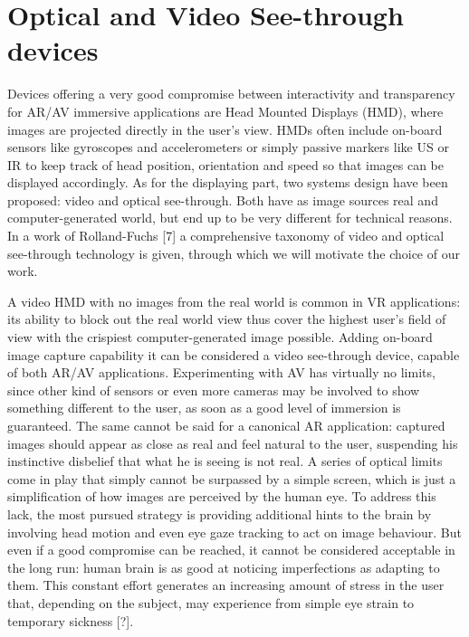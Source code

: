 \section{Optical and Video See-through devices} %
Devices offering a very good compromise between interactivity and transparency for AR/AV immersive applications are Head Mounted Displays (HMD), where images are projected directly in the user’s view. HMDs often include on-board sensors like gyroscopes and accelerometers or simply passive markers like US or IR to keep track of head position, orientation and speed so that images can be displayed accordingly. As for the displaying part, two systems design have been proposed: video and optical see-through. Both have as image sources real and computer-generated world, but end up to be very different for technical reasons. In a work of Rolland-Fuchs [7] a comprehensive taxonomy of video and optical see-through technology is given, through which we will motivate the choice of our work.

A video HMD with no images from the real world is common in VR applications: its ability to block out the real world view thus cover the highest user’s field of view with the crispiest computer-generated image possible. Adding on-board image capture capability it can be considered a video see-through device, capable of both AR/AV applications. Experimenting with AV has virtually no limits, since other kind of sensors or even more cameras may be involved to show something different to the user, as soon as a good level of immersion is guaranteed. The same cannot be said for a canonical AR application: captured images should appear as close as real and feel natural to the user, suspending his instinctive disbelief that what he is seeing is not real. A series of optical limits come in play that simply cannot be surpassed by a simple screen, which is just a simplification of how images are perceived by the human eye. To address this lack, the most pursued strategy is providing additional hints to the brain by involving head motion and even eye gaze tracking to act on image behaviour. But even if a good compromise can be reached, it cannot be considered acceptable in the long run: human brain is as good at noticing imperfections as adapting to them. This constant effort generates an increasing amount of stress in the user that, depending on the subject, may experience from simple eye strain to temporary sickness [?].

